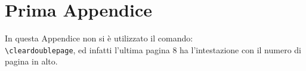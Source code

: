 \chapter{Prima Appendice}
In questa Appendice non si \`e utilizzato il comando:\\
\verb"\cleardoublepage", ed infatti
l'ultima pagina 8 ha l'intestazione con il numero di pagina in
alto.
